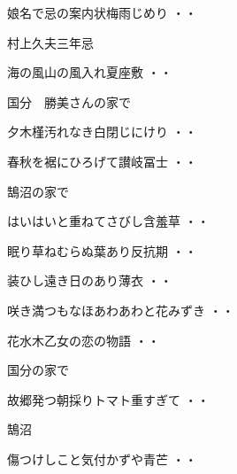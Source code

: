 \vspace{0.4cm}
\begin{shiika}娘名で忌の案内状梅雨じめり
\hfill{・・}\end{shiika}
\vspace{0.4cm}
村上久夫三年忌
\begin{shiika}海の風山の風入れ夏座敷
\hfill{・・}\end{shiika}
\vspace{0.4cm}
国分　勝美さんの家で
\begin{shiika}夕木槿汚れなき白閉じにけり
\hfill{・・}\end{shiika}
\begin{shiika}春秋を裾にひろげて讃岐冨士
\hfill{・・}\end{shiika}
\vspace{0.4cm}
鵠沼の家で
\begin{shiika}はいはいと重ねてさびし含羞草
\hfill{・・}\end{shiika}
\vspace{0.4cm}
\begin{shiika}眠り草ねむらぬ葉あり反抗期
\hfill{・・}\end{shiika}
\vspace{0.4cm}
\begin{shiika}装ひし遠き日のあり薄衣
\hfill{・・}\end{shiika}
\vspace{0.4cm}
\begin{shiika}咲き満つもなほあわあわと花みずき
\hfill{・・}\end{shiika}
\vspace{0.4cm}
\begin{shiika}花水木乙女の恋の物語
\hfill{・・}\end{shiika}
\vspace{0.4cm}
国分の家で
\begin{shiika}故郷発つ朝採りトマト重すぎて
\hfill{・・}\end{shiika}
\vspace{0.4cm}
鵠沼
\begin{shiika}傷つけしこと気付かずや青芒
\hfill{・・}\end{shiika}
